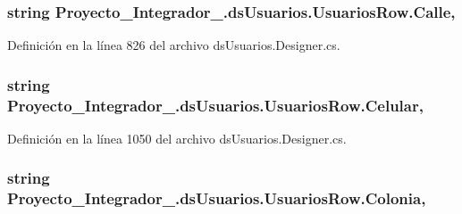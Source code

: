 \hypertarget{class_proyecto___integrador__3_1_1ds_usuarios_1_1_usuarios_row_a0886bce094a8baf1cdcb8fccf0345c48}{
\subsubsection[{Calle}]{\setlength{\rightskip}{0pt plus 5cm}string Proyecto\-\_\-\-Integrador\-\_.\-ds\-Usuarios.\-Usuarios\-Row.\-Calle\hspace{0.3cm}{\ttfamily [get]}, {\ttfamily [set]}}}\label{class_proyecto___integrador__3_1_1ds_usuarios_1_1_usuarios_row_a0886bce094a8baf1cdcb8fccf0345c48}


Definición en la línea 826 del archivo ds\-Usuarios.\-Designer.\-cs.

\hypertarget{class_proyecto___integrador__3_1_1ds_usuarios_1_1_usuarios_row_abed4782f1967d4f2fefeb7f8c23d4edb}{
\subsubsection[{Celular}]{\setlength{\rightskip}{0pt plus 5cm}string Proyecto\-\_\-\-Integrador\-\_.\-ds\-Usuarios.\-Usuarios\-Row.\-Celular\hspace{0.3cm}{\ttfamily [get]}, {\ttfamily [set]}}}\label{class_proyecto___integrador__3_1_1ds_usuarios_1_1_usuarios_row_abed4782f1967d4f2fefeb7f8c23d4edb}


Definición en la línea 1050 del archivo ds\-Usuarios.\-Designer.\-cs.

\hypertarget{class_proyecto___integrador__3_1_1ds_usuarios_1_1_usuarios_row_a799b567271f5d75af1532e54ce6df2d7}{
\subsubsection[{Colonia}]{\setlength{\rightskip}{0pt plus 5cm}string Proyecto\-\_\-\-Integrador\-\_.\-ds\-Usuarios.\-Usuarios\-Row.\-Colonia\hspace{0.3cm}{\ttfamily [get]}, {\ttfamily [set]}}}\label{class_proyecto___integrador__3_1_1ds_usuarios_1_1_usuarios_row_a799b567271f5d75af1532e54ce6df2d7}


